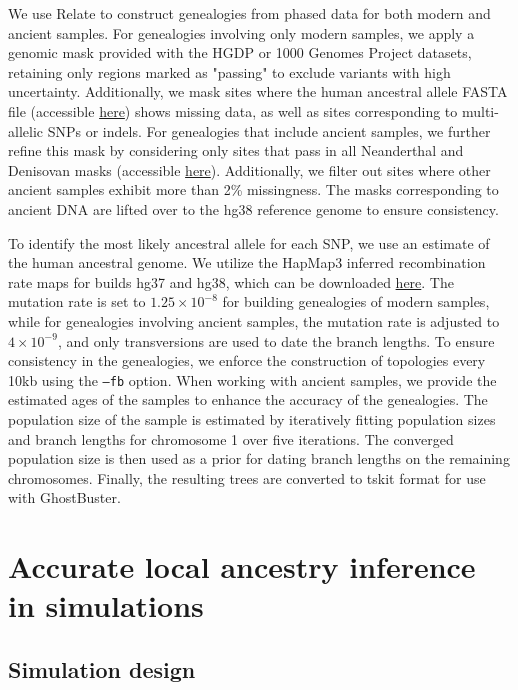 We use Relate \cite{speidel2019method} to construct genealogies from phased data for both modern and ancient samples. For genealogies involving only modern samples, we apply a genomic mask provided with the HGDP or 1000 Genomes Project datasets, retaining only regions marked as "passing" to exclude variants with high uncertainty. Additionally, we mask sites where the human ancestral allele FASTA file (accessible \href{ftp://ftp.ensembl.org/pub/release-74/fasta/ancestral_alleles/homo_sapiens_ancestor_GRCh37_e71.tar.bz2}{here}) shows missing data, as well as sites corresponding to multi-allelic SNPs or indels. For genealogies that include ancient samples, we further refine this mask by considering only sites that pass in all Neanderthal and Denisovan masks (accessible \href{http://ftp.eva.mpg.de/neandertal/}{here}). Additionally, we filter out sites where other ancient samples exhibit more than 2\% missingness. The masks corresponding to ancient DNA are lifted over to the hg38 reference genome to ensure consistency.

To identify the most likely ancestral allele for each SNP, we use an estimate of the human ancestral genome. We utilize the HapMap3 inferred recombination rate maps for builds hg37 and hg38, which can be downloaded \href{https://github.com/odelaneau/shapeit5/tree/main/resources/maps/}{here}. The mutation rate is set to $1.25 \times 10^{-8}$ for building genealogies of modern samples, while for genealogies involving ancient samples, the mutation rate is adjusted to $4 \times 10^{-9}$, and only transversions are used to date the branch lengths. To ensure consistency in the genealogies, we enforce the construction of topologies every 10kb using the \texttt{--fb} option. When working with ancient samples, we provide the estimated ages of the samples to enhance the accuracy of the genealogies. The population size of the sample is estimated by iteratively fitting population sizes and branch lengths for chromosome 1 over five iterations. The converged population size is then used as a prior for dating branch lengths on the remaining chromosomes. Finally, the resulting trees are converted to tskit format for use with GhostBuster.

\section{Accurate local ancestry inference in simulations}
\label{sec:ch2-gb-sim}
\subsection{Simulation design}
\label{sec:ch2-gb-sim-design}

